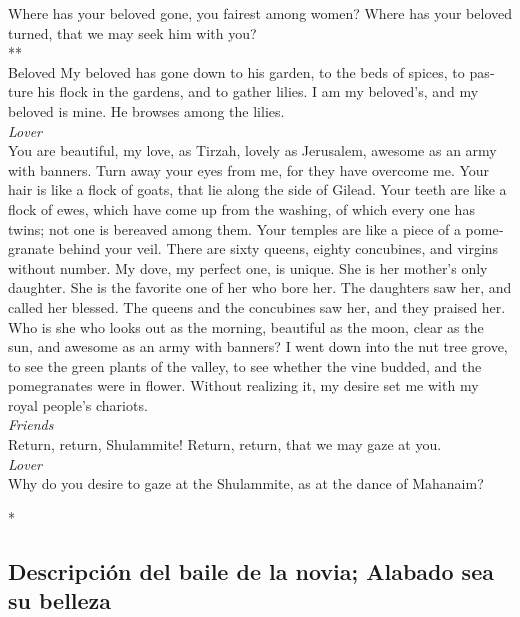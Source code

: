 \begin{paracol}{2}
\begin{otherlanguage}{english}
 Where has your beloved gone, you fairest among women?
Where has your beloved turned, that we may seek him with you?\\
**\\
Beloved  My beloved has gone down to his garden, to the
beds of spices, to pasture his flock in the gardens, and to gather
lilies.  I am my beloved's, and my beloved is mine. He
browses among the lilies.\\
\emph{Lover }\\
 You are beautiful, my love, as Tirzah, lovely as
Jerusalem, awesome as an army with banners.  Turn away
your eyes from me, for they have overcome me. Your hair is like a flock
of goats, that lie along the side of Gilead.  Your teeth
are like a flock of ewes, which have come up from the washing, of which
every one has twins; not one is bereaved among them.  Your
temples are like a piece of a pomegranate behind your veil.
 There are sixty queens, eighty concubines, and virgins
without number.  My dove, my perfect one, is unique. She
is her mother's only daughter. She is the favorite one of her who bore
her. The daughters saw her, and called her blessed. The queens and the
concubines saw her, and they praised her.  Who is she who
looks out as the morning, beautiful as the moon, clear as the sun, and
awesome as an army with banners?  I went down into the
nut tree grove, to see the green plants of the valley, to see whether
the vine budded, and the pomegranates were in flower. 
Without realizing it, my desire set me with my royal people's
chariots.\\
\emph{Friends }\\
 Return, return, Shulammite! Return, return, that we may
gaze at you.\\
\emph{Lover }\\
Why do you desire to gaze at the Shulammite, as at the dance of
Mahanaim?

\end{otherlanguage}

\switchcolumn[0]*

\hypertarget{descripciuxf3n-del-baile-de-la-novia-alabado-sea-su-belleza}{%
\subsection{Descripción del baile de la novia; Alabado sea su
belleza}\label{descripciuxf3n-del-baile-de-la-novia-alabado-sea-su-belleza}}


\end{paracol}
